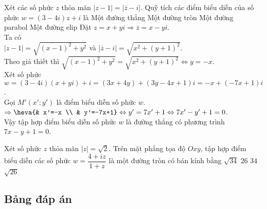 \begin{ex}%
Xét các số phức $z$ thỏa mãn $|z-1|=|\overline{z}-i|$. Quỹ tích các điểm biểu diễn của số phức $w=\left(3-4i\right)z+i$ là
\choice
{\True Một đường thẳng}
{Một đường tròn}
{Một đường parabol}
{Một đường elip}
\loigiai
{
	Đặt $z=x+yi\Rightarrow \overline{z}=x-yi$.\\
	Ta có \\
	$|z-1|=\sqrt{\left(x-1\right)^2+y^2}$ và
	$|\overline{z} -i|=\sqrt{x^2+\left(y+1\right)^2}$.\\
	Theo giả thiết thì $\sqrt{\left(x-1\right)^2+y^2}=\sqrt{x^2+\left(y+1\right)^2}\Leftrightarrow y=-x$.\\
	Xét số phức $w=\left(3-4i\right)\left(x+yi\right)+i=\left(3x+4y\right)+\left(3y-4x+1\right)i=-x+(-7x+1)i$.\\
	Gọi $M'\left(x';y'\right)$ là điểm biểu diễn số phức $w$.\\
	$\Rightarrow \heva{& x'=-x \\ & y'=-7x+1}\Leftrightarrow y'=7x'+1\Leftrightarrow 7x'-y'+1=0$.\\
	Vậy tập hợp điểm biểu diễn số phức $w$ là đường thẳng có phương trình $7x-y+1=0$.
}	
\end{ex}
\begin{ex}%
	Xét số phức $z$ thỏa mãn $|z|=\sqrt{2}$. Trên mặt phẳng tọa độ $Oxy$, tập hợp điểm biểu diễn các số phức $w=\dfrac{4+iz}{1+z}$ là một đường tròn có bán kính bằng
	\choice
	{\True $\sqrt{34}$}
	{$26$}
	{$34$}
	{$\sqrt{26}$}
	
\end{ex}

\subsection{Bảng đáp án}

